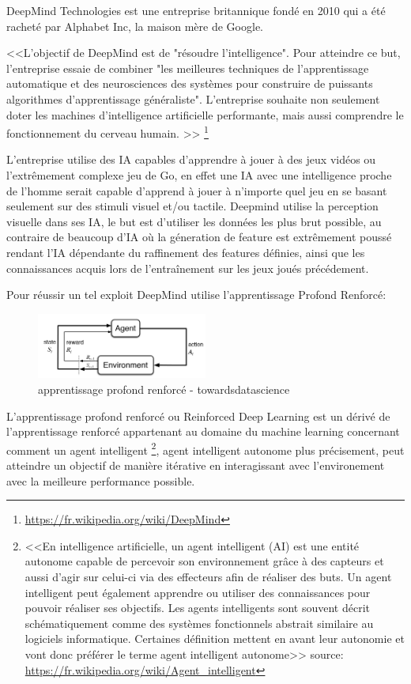 DeepMind Technologies est une entreprise britannique fondé en 2010 qui a été 
racheté par Alphabet Inc, la maison mère de Google. \newline

<<L’objectif de DeepMind est de "résoudre l'intelligence". Pour atteindre ce but, 
l'entreprise essaie de combiner "les meilleures techniques de l'apprentissage automatique et
des neurosciences des systèmes pour construire de puissants algorithmes d'apprentissage généraliste". 
L'entreprise souhaite non seulement doter les machines d'intelligence artificielle performante, 
mais aussi comprendre le fonctionnement du cerveau humain. >>
\footnote{\url{https://fr.wikipedia.org/wiki/DeepMind}} \newline

L'entreprise utilise des IA capables d'apprendre à jouer à des jeux vidéos ou l'extrêmement complexe 
jeu de Go, en effet une IA avec une intelligence proche de l'homme serait capable d'apprend à jouer 
à n'importe quel jeu en se basant seulement sur des stimuli visuel et/ou tactile. Deepmind utilise 
la perception visuelle dans ses IA, le but est d'utiliser les données les plus brut possible,
au contraire de beaucoup d'IA où la géneration de feature est extrêmement poussé rendant l'IA 
dépendante du raffinement des features définies, ainsi que les connaissances acquis lors de l'entraînement
sur les jeux joués précédement. \newline

Pour réussir un tel exploit DeepMind utilise l'apprentissage Profond Renforcé:

\begin{figure}[H]
    \centering
    \includegraphics[width=0.5\textwidth]{Images/reinforceddeeplearning}
    \caption{apprentissage profond renforcé - towardsdatascience}
    \label{fig:reinforceddeeplearning}
\end{figure}

L'apprentissage profond renforcé ou Reinforced Deep Learning est un dérivé de l'apprentissage 
renforcé appartenant au domaine du machine learning concernant comment un agent intelligent
\footnote{<<En intelligence artificielle, un agent intelligent (AI) est une entité autonome capable de 
percevoir son environnement grâce à des capteurs et aussi d'agir sur celui-ci via des effecteurs 
afin de réaliser des buts. 
Un agent intelligent peut également apprendre ou utiliser des connaissances pour pouvoir réaliser
 ses objectifs. Les agents intelligents sont souvent décrit schématiquement comme des systèmes fonctionnels abstrait 
similaire au logiciels informatique. Certaines définition mettent en avant leur autonomie 
et vont donc préférer le terme agent intelligent autonome>> \newline
source: \url{https://fr.wikipedia.org/wiki/Agent_intelligent}},
agent intelligent autonome plus précisement, peut atteindre un objectif de manière itérative en 
interagissant avec l'environement avec la meilleure performance possible.


